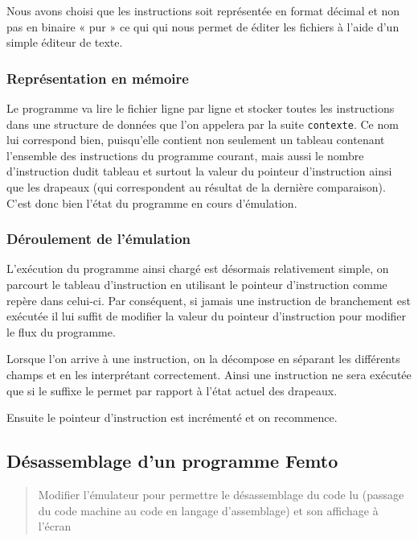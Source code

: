 \documentclass[11pt,a4paper]{article}
\begin{document}
Nous avons choisi que les instructions soit représentée en format décimal et non pas en binaire «
pur » ce qui qui nous permet de éditer les fichiers à l'aide d'un simple éditeur de texte.

\subsubsection*{Représentation en mémoire}

Le programme va lire le fichier ligne par ligne et stocker toutes les instructions dans une
structure de données que l'on appelera par la suite \texttt{contexte}. Ce nom lui correspond bien,
puisqu'elle contient non seulement un tableau contenant l'ensemble des instructions du programme
courant, mais aussi le nombre d'instruction dudit tableau et surtout la valeur du pointeur
d'instruction ainsi que les drapeaux (qui correspondent au résultat de la dernière
comparaison). C'est donc bien l'état du programme en cours d'émulation.

\subsubsection*{Déroulement de l'émulation}

L'exécution du programme ainsi chargé est désormais relativement simple, on parcourt le tableau
d'instruction en utilisant le pointeur d'instruction comme repère dans celui-ci. Par conséquent,
si jamais une instruction de branchement est exécutée il lui suffit de modifier la valeur du pointeur
d'instruction pour modifier le flux du programme.

Lorsque l'on arrive à une instruction, on la décompose en séparant les différents champs et en les
interprétant correctement. Ainsi une instruction ne sera exécutée que si le suffixe le permet par rapport
à l'état actuel des drapeaux.

Ensuite le pointeur d'instruction est incrémenté et on recommence.

\subsection{Désassemblage d'un programme Femto}

\begin{quote}
Modifier l’émulateur pour permettre le désassemblage du code lu (passage du code machine au code
en langage d’assemblage) et son affichage à l’écran
\end{quote}
\end{document}
